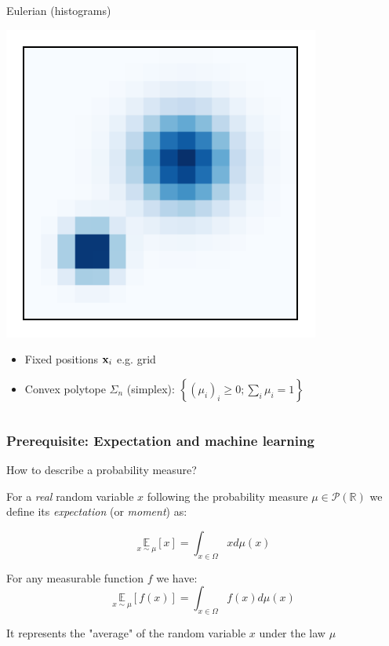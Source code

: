 \documentclass[french,9pt]{beamer}
\newcommand{\x}{{\bf x}}
\begin{document}
\begin{frame}
\begin{columns}[t]
\begin{column}{.45\linewidth}
\begin{block}{Eulerian (histograms)}
\begin{center}
\includegraphics[width=.7\linewidth]{fig/distrib_hist.pdf}
\end{center}\vspace{-5mm}
\begin{itemize}
\item Fixed positions $\x_i$ e.g. grid
\item Convex polytope $\Sigma_n$ (simplex):
$\left\{(\mu_i)_i\geq 0; \sum_i \mu_i=1\right\}$
\end{itemize}
\end{block}
\end{column}
\end{columns}
\end{frame}


\begin{frame}
\frametitle{Prerequisite: Expectation and machine learning}
How to describe a probability measure? 

For a \emph{real} random variable $x$ following the probability measure $\mu \in \mathcal{P}(\mathbb{R})$  we define its \emph{expectation} (or \emph{moment}) as:

\begin{equation}
    \underset{x \sim \mu}{\mathbb{E}}[x]=\int_{x \in \Omega} x d\mu(x)
\end{equation}{}

\pause

For any measurable function $f$ we have: $$\underset{x \sim \mu}{\mathbb{E}}[f(x)]=\int_{x \in \Omega} f(x) d\mu(x)$$

It represents the "average" of the random variable $x$ under the law $\mu$

\end{frame}
\end{document}
